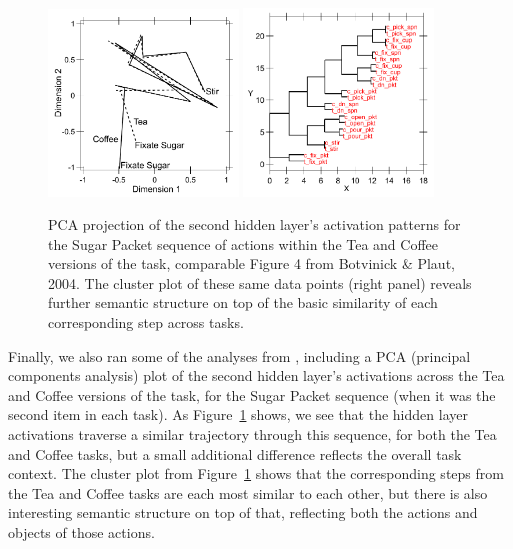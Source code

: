 \documentclass[10pt,letterpaper]{article}
\numberwithin{equation}{section}
\begin{document}
\begin{figure}
  \centering
  \includegraphics[width=0.45\textwidth]{figs/fig_tea_vs_coffee_sugar_pack_pca}
  \includegraphics[width=0.45\textwidth]{figs/fig_tea_vs_coffee_sugar_pack_clust}
  \caption{PCA projection of the second hidden layer's activation patterns for the Sugar Packet sequence of actions within the Tea and Coffee versions of the task, comparable Figure 4 from Botvinick \& Plaut, 2004.  The cluster plot of these same data points (right panel) reveals further semantic structure on top of the basic similarity of each corresponding step across tasks.}
  \label{fig:svg}
\end{figure}

Finally, we also ran some of the analyses from , including a PCA (principal components analysis) plot of the second hidden layer's activations across the Tea and Coffee versions of the task, for the Sugar Packet sequence (when it was the second item in each task).  As Figure~\ref{fig:svg} shows, we see that the hidden layer activations traverse a similar trajectory through this sequence, for both the Tea and Coffee tasks, but a small additional difference reflects the overall task context.  The cluster plot from Figure~\ref{fig:svg} shows that the corresponding steps from the Tea and Coffee tasks are each most similar to each other, but there is also interesting semantic structure on top of that, reflecting both the actions and objects of those actions.
\end{document}
